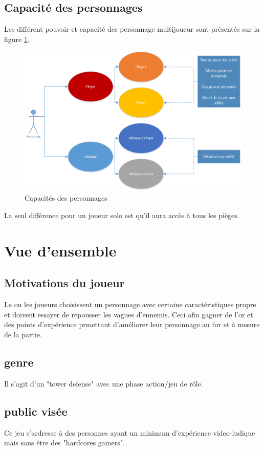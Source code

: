 \documentclass[12pt]{article}
\begin{document}
\subsection{Capacité des personnages}
Les différent pouvoir et capacité des personnage multijoueur sont présentés sur la figure \ref{Capacite des personnages}.
\begin{figure}[h]
\begin{center}
\includegraphics[scale=0.7]{capacite.png} 
\end{center}
\caption{Capacités des personnages}
\label{Capacite des personnages}
\end{figure}
La seul différence pour un joueur solo est qu'il aura accès à tous les pièges.

\pagebreak
\section{Vue d'ensemble}
\subsection{Motivations du joueur}
Le ou les joueurs choisissent un personnage avec certaine caractéristiques propre et doivent essayer de repousser les vagues d'ennemis. Ceci afin gagner de l'or et des points d'expérience prmettant d'améliorer leur personnage au fur et à mesure de la partie.
\subsection{genre}
Il s'agit d'un "tower defense" avec une phase action/jeu de rôle.
\subsection{public visée}
Ce jeu s'ardresse à des personnes ayant un minimum d'expérience video-ludique mais sans être des "hardcores gamers".
\end{document}
